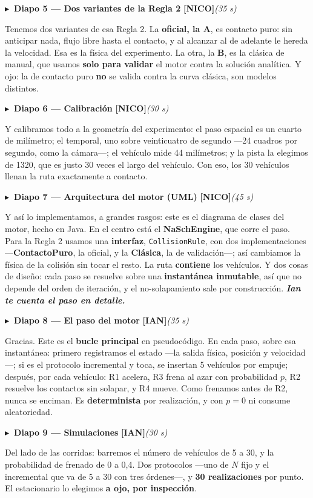 \documentclass[11pt,a4paper]{article}
\newcommand{\diapo}[5]{%
  \medskip\par\noindent
  \textcolor{#4}{\textbf{$\blacktriangleright$\ Diapo #1 --- #2}}\quad
  \textcolor{#4}{\textbf{[#3]}}\hfill{\itshape\small(#5)}\par\nobreak\smallskip
}
\newcommand{\relevo}[1]{\hfill\textbf{\itshape #1}}
\begin{document}
\diapo{5}{Dos variantes de la Regla 2}{NICO}{cnico}{35 s}
Tenemos dos variantes de esa Regla 2. La \textbf{oficial, la A}, es contacto puro: sin anticipar nada, flujo
libre hasta el contacto, y al alcanzar al de adelante le hereda la velocidad. Esa es la física del experimento.
La otra, la \textbf{B}, es la clásica de manual, que usamos \textbf{solo para validar} el motor contra la
solución analítica. Y ojo: la de contacto puro \textbf{no} se valida contra la curva clásica, son modelos
distintos.

\diapo{6}{Calibración}{NICO}{cnico}{30 s}
Y calibramos todo a la geometría del experimento: el paso espacial es un cuarto de milímetro; el temporal, uno
sobre veinticuatro de segundo ---24 cuadros por segundo, como la cámara---; el vehículo mide 44 milímetros; y la
pista la elegimos de 1320, que es justo 30 veces el largo del vehículo. Con eso, los 30 vehículos llenan la ruta
exactamente a contacto.

\diapo{7}{Arquitectura del motor (UML)}{NICO}{cnico}{45 s}
Y así lo implementamos, a grandes rasgos: este es el diagrama de clases del motor, hecho en Java. En el centro
está el \textbf{NaSchEngine}, que corre el paso. Para la Regla 2 usamos una \textbf{interfaz},
\texttt{CollisionRule}, con dos implementaciones ---\textbf{ContactoPuro}, la oficial, y la \textbf{Clásica}, la de
validación---; así cambiamos la física de la colisión sin tocar el resto. La ruta \textbf{contiene} los vehículos.
Y dos cosas de diseño: cada paso se resuelve sobre una \textbf{instantánea inmutable}, así que no depende del
orden de iteración, y el no-solapamiento sale por construcción. \relevo{Ian te cuenta el paso en detalle.}

\diapo{8}{El paso del motor}{IAN}{cian}{35 s}
Gracias. Este es el \textbf{bucle principal} en pseudocódigo. En cada paso, sobre esa instantánea: primero
registramos el estado ---la salida física, posición y velocidad---; si es el protocolo incremental y toca, se
insertan 5 vehículos por empuje; después, por cada vehículo: R1 acelera, R3 frena al azar con probabilidad $p$,
R2 resuelve los contactos sin solapar, y R4 mueve. Como frenamos antes de R2, nunca se enciman. Es
\textbf{determinista} por realización, y con $p=0$ ni consume aleatoriedad.

\diapo{9}{Simulaciones}{IAN}{cian}{30 s}
Del lado de las corridas: barremos el número de vehículos de 5 a 30, y la probabilidad de frenado de 0 a 0,4.
Dos protocolos ---uno de $N$ fijo y el incremental que va de 5 a 30 con tres órdenes---, y \textbf{30
realizaciones} por punto. El estacionario lo elegimos \textbf{a ojo, por inspección}.
\end{document}
